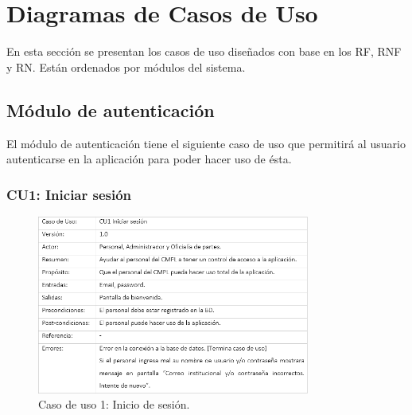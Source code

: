 \section{Diagramas de Casos de Uso}
	En esta sección se presentan los casos de uso diseñados con base en los RF, RNF y RN. Están ordenados por módulos del sistema.
	\subsection{Módulo de autenticación}
	El módulo de autenticación tiene el siguiente caso de uso que permitirá al usuario autenticarse en la aplicación para poder hacer uso de ésta.
		\subsubsection{CU1: Iniciar sesión}
			\begin{figure}[htbp!]
				\centering
					\includegraphics[width=0.8\textwidth]{images/CU/CU1}
					\caption{Caso de uso 1: Inicio de sesión.}
				\label{Tabla}
			\end{figure}

